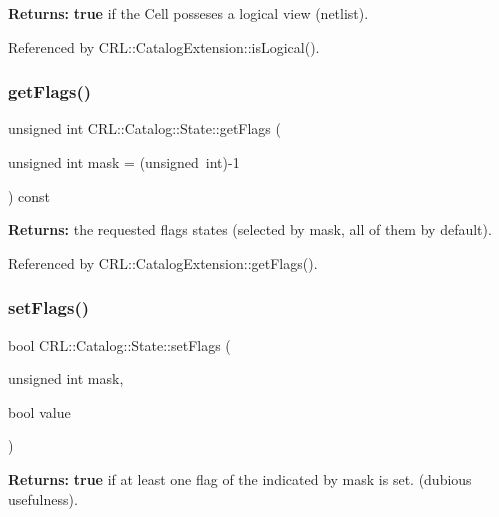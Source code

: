 {\bfseries Returns\+:} {\bfseries true} if the Cell posseses a logical view (netlist). 

Referenced by C\+R\+L\+::\+Catalog\+Extension\+::is\+Logical().

\mbox{\label{classCRL_1_1Catalog_1_1State_a80ac3efddd043ec7151680755cc3db42}} 
\subsubsection{\texorpdfstring{get\+Flags()}{getFlags()}}
{\footnotesize\ttfamily unsigned int C\+R\+L\+::\+Catalog\+::\+State\+::get\+Flags (\begin{DoxyParamCaption}\item[{unsigned int}]{mask = {\ttfamily (unsigned~int)-\/1} }\end{DoxyParamCaption}) const\hspace{0.3cm}{\ttfamily [inline]}}

{\bfseries Returns\+:} the requested flags states (selected by {\ttfamily mask}, all of them by default). 

Referenced by C\+R\+L\+::\+Catalog\+Extension\+::get\+Flags().

\mbox{\label{classCRL_1_1Catalog_1_1State_a73a3866e9da359611638b2d725a79613}} 
\subsubsection{\texorpdfstring{set\+Flags()}{setFlags()}}
{\footnotesize\ttfamily bool C\+R\+L\+::\+Catalog\+::\+State\+::set\+Flags (\begin{DoxyParamCaption}\item[{unsigned int}]{mask,  }\item[{bool}]{value }\end{DoxyParamCaption})\hspace{0.3cm}{\ttfamily [inline]}}

{\bfseries Returns\+:} {\bfseries true} if at least one flag of the indicated by mask is set. (dubious usefulness).

